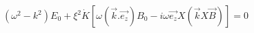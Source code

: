 \begin{equation}
({\omega}^{2}-k^{2}){E_{0}}+{\xi}^{2}\dot{K}[{\omega}(\vec{k}.\vec{e_{z}})B_{0}- i{\omega}\vec{e_{z}}X(\vec{k}X\vec{B})]= 0
\label{32}
\end{equation}

